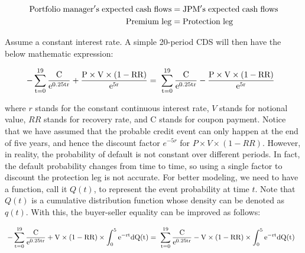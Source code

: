 \documentclass{jss}
\begin{document}
\begin{align}
  \rm Portfolio\hspace{3pt}manager's\hspace{3pt}expected\hspace{3pt}cash\hspace{3pt}flows &= \rm JPM's\hspace{3pt}expected\hspace{3pt}cash\hspace{3pt}flows \\
  \rm Premium\hspace{3pt}leg &= \rm Protection\hspace{3pt}leg
\end{align}

Assume a constant interest rate. A simple 20-period CDS will then have the below mathematic expression:

\begin{align}
  \rm \hspace{3pt}- \sum_{t = 0}^{19} \frac{C}{e^{0.25tr}} + \frac{P \times V \times (1 - RR)}{e^{5r}}  &= \rm \hspace{3pt} \sum_{t = 0}^{19} \frac{C}{e^{0.25tr}} - \frac{P \times V \times (1 - RR)}{e^{5r}} 
\end{align}

where $r$ stands for the constant continuous interest rate, $V$ stands for notional value, $RR$ stands for recovery rate, and C stands for coupon payment. Notice that we have assumed that the probable credit event can only happen at the end of five years, and hence the discount factor $e^{-5r}$ for $P \times V \times (1 - RR)$. However, in reality, the probability of default is not constant over different periods. In fact, the default probability changes from time to time, so using a single factor to discount the protection leg is not accurate. For better modeling, we need to have a function, call it $Q(t)$, to represent the event probability at time $t$. Note that $Q(t)$ is a cumulative distribution function whose density can be denoted as $q(t)$. With this, the buyer-seller equality can be improved as follows:

\begin{align}
  \rm \hspace{3pt}- \sum_{t = 0}^{19} \frac{C}{e^{0.25tr}} + V \times (1 - RR) \times \int_0^5 e^{-rt}dQ(t)  &= \rm \hspace{3pt} \sum_{t = 0}^{19} \frac{C}{e^{0.25tr}} - V \times (1 - RR) \times \int_0^5 e^{-rt}dQ(t) 
\end{align}
\end{document}
